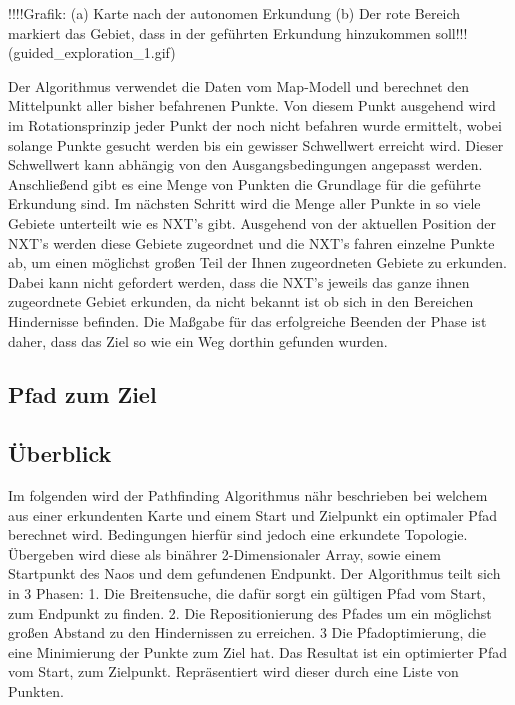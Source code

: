 \begin{enumerate}
!!!!Grafik: (a) Karte nach der autonomen Erkundung (b) Der rote Bereich markiert das Gebiet, dass in der geführten Erkundung hinzukommen soll!!! (guided_exploration_1.gif)

Der Algorithmus verwendet die Daten vom Map-Modell und berechnet den Mittelpunkt aller bisher befahrenen Punkte. Von diesem Punkt ausgehend wird im Rotationsprinzip jeder Punkt der noch nicht befahren wurde ermittelt, wobei solange Punkte gesucht werden bis ein gewisser Schwellwert erreicht wird. Dieser Schwellwert kann abhängig von den Ausgangsbedingungen angepasst werden. Anschließend gibt es eine Menge von Punkten die Grundlage für die geführte Erkundung sind. Im nächsten Schritt wird die Menge aller Punkte in so viele Gebiete unterteilt wie es NXT's gibt. Ausgehend von der aktuellen Position der NXT's werden diese Gebiete zugeordnet und die NXT's fahren einzelne Punkte ab, um einen möglichst großen Teil der Ihnen zugeordneten Gebiete zu erkunden. Dabei kann nicht gefordert werden, dass die NXT's jeweils das ganze ihnen zugeordnete Gebiet erkunden, da nicht bekannt ist ob sich in den Bereichen Hindernisse befinden. Die Maßgabe für das erfolgreiche Beenden der Phase ist daher, dass das Ziel so wie ein Weg dorthin gefunden wurden. 

\subsection{Pfad zum Ziel}
\subsection*{Überblick}
	Im folgenden wird der Pathfinding Algorithmus nähr beschrieben bei welchem aus einer erkundenten Karte und einem Start und Zielpunkt ein optimaler Pfad berechnet wird. Bedingungen hierfür sind jedoch eine erkundete Topologie. Übergeben wird diese als binährer 2-Dimensionaler Array, sowie einem Startpunkt des Naos und dem gefundenen Endpunkt. Der Algorithmus teilt sich in 3 Phasen: 1. Die Breitensuche, die dafür sorgt ein gültigen Pfad vom Start, zum Endpunkt zu finden. 2. Die Repositionierung des Pfades um ein möglichst großen Abstand zu den Hindernissen zu erreichen. 3 Die Pfadoptimierung, die eine Minimierung der Punkte zum Ziel hat. Das Resultat ist ein optimierter Pfad vom Start, zum Zielpunkt. Repräsentiert wird dieser durch eine Liste von Punkten.

\end{enumerate}
